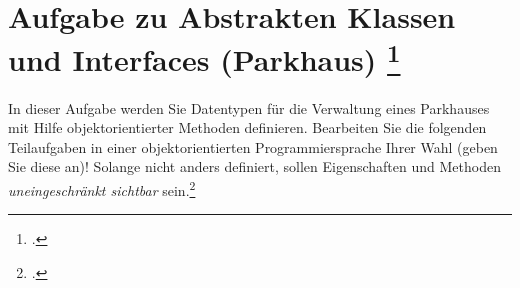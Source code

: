 \documentclass{lehramt-informatik-aufgabe}
\begin{document}
\section{Aufgabe zu Abstrakten Klassen und Interfaces (Parkhaus)
\footcite[Thema 2 Teilaufgabe 2 Aufgabe 1 Seite 11]{examen:66116:2014:03}
}

In dieser Aufgabe werden Sie Datentypen für die Verwaltung eines
Parkhauses mit Hilfe objektorientierter Methoden definieren. Bearbeiten
Sie die folgenden Teilaufgaben in einer objektorientierten
Programmiersprache Ihrer Wahl (geben Sie diese an)! Solange nicht anders
definiert, sollen Eigenschaften und Methoden \emph{uneingeschränkt
sichtbar} sein.\footcite{aud:ab:1}

\renewcommand{\labelenumi}{(\alph{enumi})}
\renewcommand{\labelenumii}{(\roman{enumii})}
\end{document}
